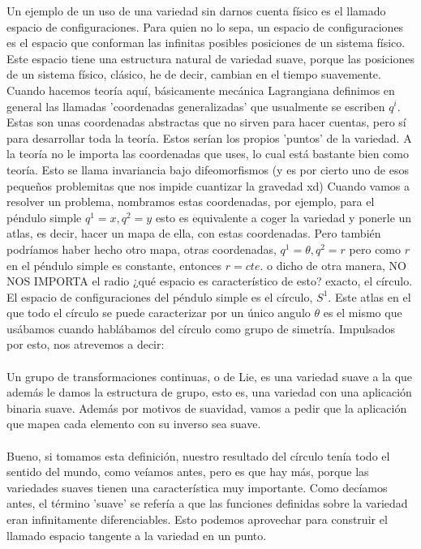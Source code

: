 \documentclass[12pt]{article}
\begin{document}
Un ejemplo de un uso de una variedad sin darnos cuenta físico es el llamado espacio de configuraciones. Para quien no lo sepa, un espacio de configuraciones es el espacio que conforman las infinitas posibles posiciones de un sistema físico. Este espacio tiene una estructura natural de variedad suave, porque las posiciones de un sistema físico, clásico, he de decir, cambian en el tiempo suavemente. Cuando hacemos teoría aquí, básicamente mecánica Lagrangiana definimos en general las llamadas 'coordenadas generalizadas' que usualmente se escriben $q^i$. Estas son unas coordenadas abstractas que no sirven para hacer cuentas, pero sí para desarrollar toda la teoría. Estos serían los propios 'puntos' de la variedad.  A la teoría no le importa las coordenadas que uses, lo cual está bastante bien como teoría. Esto se llama invariancia bajo difeomorfismos (y es por cierto uno de esos pequeños problemitas que nos impide cuantizar la gravedad xd) Cuando vamos a resolver un problema, nombramos estas coordenadas, por ejemplo, para el péndulo simple $q^1=x, q^2=y$ esto es equivalente a coger la variedad y ponerle un atlas, es decir, hacer un mapa de ella, con estas coordenadas. Pero también podríamos haber hecho otro mapa, otras coordenadas, $q^1=\theta, q^2=r$ pero como $r$ en el péndulo simple es constante, entonces $r=cte.$ o dicho de otra manera, NO NOS IMPORTA el radio ¿qué espacio es característico de esto? exacto, el círculo. El espacio de configuraciones del péndulo simple es el círculo, $S^1$. Este atlas en el que todo el círculo se puede caracterizar por un único angulo $\theta$ es el mismo que usábamos cuando hablábamos del círculo como grupo de simetría. Impulsados por esto, nos atrevemos a decir:
\\\\
Un grupo de transformaciones continuas, o de Lie, es una variedad suave a la que además le damos la estructura de grupo, esto es, una variedad con una aplicación binaria suave.
Además por motivos de suavidad, vamos a pedir que la aplicación que mapea cada elemento con su inverso sea suave.
\\\\
Bueno, si tomamos esta definición, nuestro resultado del círculo tenía todo el sentido del mundo, como veíamos antes, pero es que hay más, porque las variedades suaves tienen una característica muy  importante. Como decíamos antes, el término 'suave' se refería a que las funciones definidas sobre la variedad eran infinitamente diferenciables. Esto podemos aprovechar para construir el llamado espacio tangente a la variedad en un punto. \\\\
\end{document}
